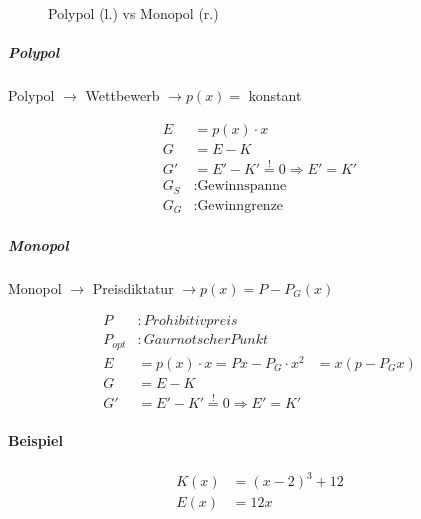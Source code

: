 \begin{figure}[H]
    \caption{Polypol (l.) vs Monopol (r.)}
\end{figure}

\subparagraph{Polypol}

Polypol \( \rightarrow \) Wettbewerb \( \rightarrow p(x) = \) konstant

\begin{align*}
    E &= p(x) \cdot x \\
    G &= E - K \\
    G' &= E' - K' \overset{!}{=} 0 \Rightarrow E' = K' \\
    G_S &: \text{Gewinnspanne} \\
    G_G &: \text{Gewinngrenze}
\end{align*}

\subparagraph{Monopol}

Monopol \( \rightarrow \) Preisdiktatur \( \rightarrow p(x) = P - P_G(x) \)

\begin{align*}
    P &: Prohibitivpreis \\
    P_{opt} &: Gaurnotscher Punkt \\
    E &= p(x) \cdot x = Px - P_G \cdot x^2 &= x(p - P_G x) \\
    G &= E - K \\
    G' &= E' - K' \overset{!}{=} 0 \Rightarrow E' = K'
\end{align*}

\paragraph{Beispiel}

\begin{align*}
    K(x) &= {(x - 2)}^3 + 12 \\
    E(x) &= 12x
\end{align*}


